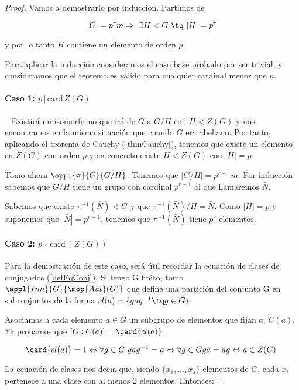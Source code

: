 \documentclass[nochap]{apuntes}
\begin{document}
\begin{proof}
 Vamos a demostrarlo por inducción. Partimos de 
 
 \[ |G|=p^{r}m \Rightarrow \ \exists H < G \ \tq \ |H|=p^{r} \] 
 
 y por lo tanto $H$ contiene un elemento de orden $p$. 
 
 Para aplicar la inducción consideramos el caso base probado por ser trivial, y consideramos que el teorema es válido para cualquier cardinal menor que $n$.
\paragraph{Caso 1: $p\,|\, \mathrm{card}\, Z(G)$}  \pbreak
     Existirá un isomorfismo que irá de $G$ a $G/H$ con $H < Z(G)$ y nos encontramos en la misma situación que cuando $G$ era abeliano.
    Por tanto, aplicando el teorema de Cauchy (\ref{thmCauchy}), tenemos que existe un elemento en $Z(G)$ con orden $p$ y en concreto existe $H < Z(G)$ con $|H|=p$.
    
    Tomo ahora $\appl{\pi}{G}{G/H}$. Tenemos que $|G/H|=p^{r-1}m$. Por inducción sabemos que $G/H$ tiene un grupo con cardinal $p^{r-1}$ al que llamaremos $\bar{N}$.
    
    Sabemos que existe $\pi^{-1}(\bar{N}) < G$  y que $\pi^{-1}(\bar{N}) /H=\bar{N}$. Como $|H|=p$ y suponemos que $|\bar{N}|=p^{r-1}$, tenemos que $\pi^{-1}(\bar{N})$ tiene $p^{r}$  elementos.
    
\paragraph{Caso 2: $p \nmid   \mathrm{card}\, (Z(G))$} \pbreak
  Para la demostración de este caso, será útil recordar la ecuación de clases de conjugados (\ref{defEqConj}). Si tengo G finito, tomo $\appl{Inn}{G}{\mop{Aut}(G)}$  que define una partición del conjunto G en subconjuntos de la forma $cl(a)=\{gag^{-1} \tq g\in G\}$.
  
  Asociamos a cada elemento $a \in G$ un subgrupo de elementos que fijan $a$, $C(a)$. Ya probamos que $[G:C(a)]=\card{cl(a)}$.
  
  \[ \card{cl(a)}=1 \Leftrightarrow \forall g\in G \ gag^{-1}=a \Leftrightarrow \forall g \in G ga=ag \Leftrightarrow a \in Z(G) \]
  
  La ecuación de clases nos decía que, siendo $\{ x_1, \hdots, x_s \}$ elementos de $G$, cada $x_i$ pertenece a una clase con al menos 2 elementos. Entonces:
  

\end{proof}
\end{document}
